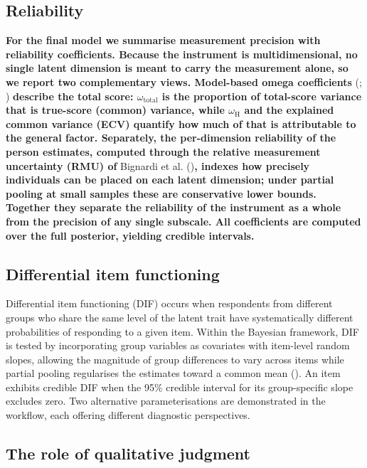 \documentclass[
  man,
  floatsintext,
  longtable,
  nolmodern,
  notxfonts,
  notimes,
  colorlinks=true,linkcolor=blue,citecolor=blue,urlcolor=blue]{apa7}
\newcommand{\rev}[1]{\textbf{\textcolor{revcol}{#1}}}  %
\begin{document}
\subsection{\texorpdfstring{\rev{Reliability}}{}}\label{section}

\rev{For the final model we summarise measurement precision with reliability coefficients. Because the instrument is multidimensional, no single latent dimension is meant to carry the measurement alone, so we report two complementary views. Model-based omega coefficients}
(;
)
\rev{describe the total score: $\omega_{\text{total}}$ is the proportion of total-score variance that is true-score (common) variance, while $\omega_{\text{H}}$ and the explained common variance (ECV) quantify how much of that is attributable to the general factor. Separately, the per-dimension reliability of the person estimates, computed through the relative measurement uncertainty (RMU) of}
Bignardi et al.
()\rev{, indexes how precisely individuals can be placed on each latent dimension; under partial pooling at small samples these are conservative lower bounds. Together they separate the reliability of the instrument as a whole from the precision of any single subscale. All coefficients are computed over the full posterior, yielding credible intervals.}

\subsection{Differential item
functioning}\label{differential-item-functioning}

Differential item functioning (DIF) occurs when respondents from
different groups who share the same level of the latent trait have
systematically different probabilities of responding to a given item.
Within the Bayesian framework, DIF is tested by incorporating group
variables as covariates with item-level random slopes, allowing the
magnitude of group differences to vary across items while partial
pooling regularises the estimates toward a common mean
(). An item exhibits
credible DIF when the 95\% credible interval for its group-specific
slope excludes zero. Two alternative parameterisations are demonstrated
in the workflow, each offering different diagnostic perspectives.

\subsection{The role of qualitative
judgment}\label{the-role-of-qualitative-judgment}
\end{document}
